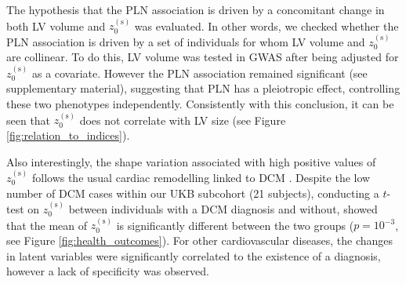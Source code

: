 The hypothesis that the PLN association is driven by a concomitant change in both LV volume and $z_0^{(\text{s})}$ was evaluated. In other words, we checked whether the PLN association is driven by a set of individuals for whom LV volume and $z_0^{(\text{s})}$ are collinear. To do this, LV volume was tested in GWAS after being adjusted for $z_0^{(\text{s})}$ as a covariate. However the PLN association remained significant (see supplementary material), suggesting that PLN has a pleiotropic effect, controlling these two phenotypes independently. Consistently with this conclusion, it can be seen that $z_0^{(\text{s})}$ does not correlate with LV size (see Figure \ref{fig:relation_to_indices}).

Also interestingly, the shape variation associated with high positive values of $z_0^{(\text{s})}$ follows the usual cardiac remodelling linked to DCM \cite{ref_dcm}. Despite the low number of DCM cases within our UKB subcohort (21 subjects), conducting a $t$-test on $z_0^{(\text{s})}$ between individuals with a DCM diagnosis and without, showed that the mean of $z_0^{(\text{s})}$ is significantly different between the two groups ($p=10^{-3}$, see Figure \ref{fig:health_outcomes}). For other cardiovascular diseases, the changes in latent variables were significantly correlated to the existence of a diagnosis, however a lack of specificity was observed.

